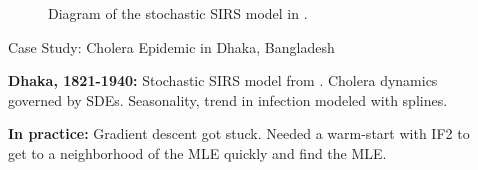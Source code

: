 \documentclass[final]{beamer}
\newlength{\sepwidth}
\newlength{\colwidth}
\newcommand{\separatorcolumn}{\begin{column}{\sepwidth}\end{column}}
\begin{document}
\begin{frame}[t]
\begin{columns}[t]
\begin{column}{\colwidth}
\end{column}

\separatorcolumn
\begin{column}{\colwidth}

\vspace{-2ex}
\begin{figure}[H]
    \vspace{-2ex}
    \caption{Diagram of the stochastic SIRS model in \cite{king08}. 
    }
\end{figure}

\vspace{.5ex}
  \begin{exampleblock}{Case Study: Cholera Epidemic in Dhaka, Bangladesh}

  \textbf{Dhaka, 1821-1940:} Stochastic SIRS model from \cite{king08}. Cholera dynamics governed by SDEs. Seasonality, trend in infection modeled with splines.

  \textbf{In practice:} Gradient descent got stuck. Needed a warm-start with IF2 \cite{ionides15} to get to a neighborhood of the MLE quickly and find the MLE.
  \vspace{0.8ex}
  

\end{exampleblock}
\end{column}
\end{columns}
\end{frame}
\end{document}
